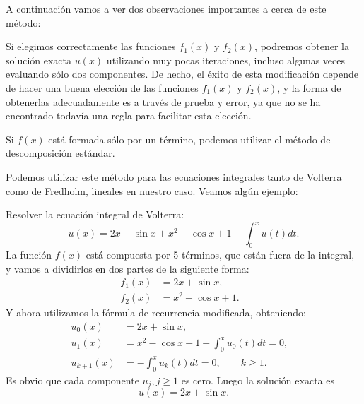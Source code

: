 A continuación vamos a ver dos observaciones importantes a cerca de este método:
\begin{observacion}
	Si elegimos correctamente las funciones $f_1(x)$ y $f_2(x)$, podremos obtener la solución exacta $u(x)$ utilizando muy pocas iteraciones, incluso algunas veces evaluando sólo dos componentes. De hecho, el éxito de esta modificación depende de hacer una buena elección de las funciones $f_1(x)$ y $f_2(x)$, y la forma de obtenerlas adecuadamente es a través de prueba y error, ya que no se ha encontrado todavía una regla para facilitar esta elección.
\end{observacion}

\begin{observacion}
	Si $f(x)$ está formada sólo por un término, podemos utilizar el método de descomposición estándar.
\end{observacion}

Podemos utilizar este método para las ecuaciones integrales tanto de Volterra como de Fredholm, lineales en nuestro caso. Veamos algún ejemplo:

\begin{ejemplo}
	Resolver la ecuación integral de Volterra:
	\begin{equation}
		u(x) = 2x + \sin x + x^2 - \cos x + 1 - \int_{0}^{x} u(t)dt.
	\end{equation}
	La función $f(x)$ está compuesta por 5 términos, que están fuera de la integral, y vamos a dividirlos en dos partes de la siguiente forma:
	\begin{align}
		f_1(x) &= 2x + \sin x,      &   \\
		f_2(x) &= x^2 - \cos x + 1.    &
	\end{align}
	Y ahora utilizamos la fórmula de recurrencia modificada, obteniendo:
	\begin{align}
		u_0(x) &= 2x + \sin x,      &   \\
		u_{1}(x) &= x^2 - \cos x + 1 - \int_{0}^{x} u_0(t)dt = 0,    &  \\
		u_{k+1}(x) &= - \int_{0}^{x} u_k(t)dt = 0, \qquad k \geqslant 1.    &
	\end{align}
	Es obvio que cada componente $u_j, j \geqslant 1$ es cero. Luego la solución exacta es
	\begin{equation}
		u(x) = 2x + \sin x.
	\end{equation}
\end{ejemplo}


